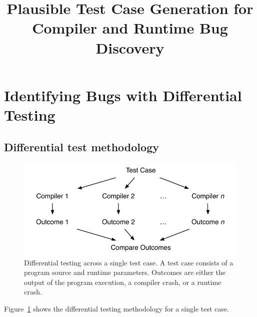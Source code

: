 



\title{Plausible Test Case Generation for Compiler and Runtime Bug Discovery}

%
%

\maketitle






\section{Identifying Bugs with Differential Testing}

\subsection{Differential test methodology}

\begin{figure}
  \centering
  \includegraphics[width=.9\columnwidth]{img/difftest} %
  \caption{%
    Differential testing across a single test case. A test case consists of a program source and runtime parameters. Outcomes are either the output of the program execution, a compiler crash, or a runtime crash.%
  }%
  \label{fig:difftest}
\end{figure}

Figure~\ref{fig:difftest} shows the differential testing methodology for a single test case.

